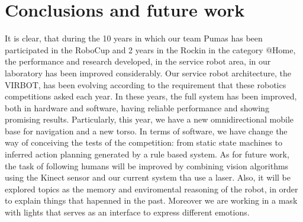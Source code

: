 \documentclass{llncs}
\begin{document}
\section{Conclusions and future work}\label{sec:conclusions}
It is clear, that during the 10 years in which our team Pumas has been participated in the RoboCup and 2 years in the Rockin \cite{Robocup_2017} in the category @Home, the performance and research developed, in the service robot area, in our laboratory has been improved considerably.
Our service robot architecture, the VIRBOT, has been evolving according to the requirement that these robotics competitions asked each year.
In these years, the full system has been improved, both in hardware and software, having reliable performance and showing promising results. Particularly, this year, we have a new omnidirectional mobile base for navigation and a new torso. 
In terms of software, we have change the way of conceiving the tests of the competition: from static state machines to inferred action planning generated by a rule based system. 
As for future work, the task of following humans will be improved by combining vision algorithms using the Kinect sensor and our current system tha use a laser. Also, it will be explored topics as the memory and enviromental reasoning of the robot, in order to explain things that hapenned in the past. Moreover we are working in a mask with lights that serves as an interface to express different emotions.


\end{document}
